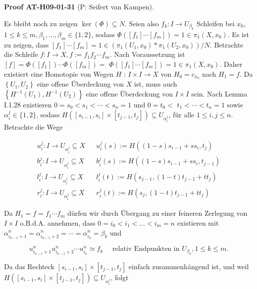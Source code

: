 \documentclass[10pt, letterpaper]{article}
\newcommand{\CustomHeading}[3]{%
  \par\medskip\noindent%
  \textbf{#1 #2} \textnormal{(#3)}.\enskip%
}
\newenvironment{PROOF}[2]{\begin{unitbox}\CustomHeading{Proof}{#1}{#2}}{\end{unitbox}}
\begin{document}
\begin{PROOF}{AT-H09-01-31}{P: Seifert van Kampen}
Es bleibt noch zu zeigen $\operatorname{ker}(\Phi) \subseteq N$. Seien also $f_k: I \rightarrow U_{\beta_k}$ Schleifen bei $x_0$, $1 \leq k \leq m, \beta_1, \ldots, \beta_m \in\{1,2\}$, sodass $\Phi\left(\left[f_1\right] \cdots\left[f_m\right]\right)=1 \in \pi_1\left(X, x_0\right)$. Es ist zu zeigen, dass $\left[f_1\right] \cdots\left[f_m\right]=1 \in\left(\pi_1\left(U_1, x_0\right) * \pi_1\left(U_2, x_0\right)\right) / N$. Betrachte die Schleife $f: I \rightarrow X, f:=f_1 f_2 \cdots f_m$. Nach Voraussetzung ist $[f]=\Phi\left(\left[f_1\right]\right) \cdots \Phi\left(\left[f_m\right]\right)=$ $\Phi\left(\left[f_1\right] \cdots\left[f_m\right]\right)=1 \in \pi_1\left(X, x_0\right)$. Daher existiert eine Homotopie von Wegen $H$ : $I \times I \rightarrow X$ von $H_0=c_{x_0}$ nach $H_1=f$. Da $\left\{U_1, U_2\right\}$ eine offene Überdeckung von $X$ ist, muss auch $\left\{H^{-1}\left(U_1\right), H^{-1}\left(U_2\right)\right\}$ eine offene Überdeckung von $I \times I$ sein. Nach Lemma I.1.28 existieren $0=s_0<s_1<\cdots<s_n=1$ und $0=t_0<$ $t_1<\cdots<t_n=1$ sowie $\alpha_i^j \in\{1,2\}$, sodass $H\left(\left[s_{i-1}, s_i\right] \times\left[t_{j-1}, t_j\right]\right) \subseteq U_{\alpha_i^j}$, für alle $1 \leq i, j \leq n$. Betrachte die Wege

$$
\begin{aligned}
u_i^j: I \rightarrow U_{\alpha_i^j} \subseteq X & & u_i^j(s):=H\left((1-s) s_{i-1}+s s_i, t_j\right) \\
b_i^j: I \rightarrow U_{\alpha_i^j} \subseteq X & & b_i^j(s):=H\left((1-s) s_{i-1}+s s_i, t_{j-1}\right) \\
l_i^j: I \rightarrow U_{\alpha_i^j} \subseteq X & & l_i^j(t):=H\left(s_{j-1},(1-t) t_{j-1}+t t_j\right) \\
r_i^j: I \rightarrow U_{\alpha_i^j} \subseteq X & & r_i^j(t):=H\left(s_j,(1-t) t_{j-1}+t t_j\right)
\end{aligned}
$$


Da $H_1=f=f_1 \cdots f_m$ dürfen wir durch Übergang zu einer feineren Zerlegung von $I \times I$ o.B.d.A. annehmen, dass $0=i_0<i_1<\ldots<i_m=n$ existieren mit $\alpha_{i_{k-1}+1}^n=\alpha_{i_{k-1}+2}^n=\cdots=\alpha_{i_k}^n=\beta_k$ und

$$
u_{i_{k-1}+1}^n u_{i_{k-1}+2}^n \cdots u_{i_k}^n \simeq f_k \quad \text { relativ Endpunkten in } U_{\beta_k}, 1 \leq k \leq m .
$$


Da das Rechteck $\left[s_{i-1}, s_i\right] \times\left[t_{j-1}, t_j\right]$ einfach zusammenhängend ist, und weil $H\left(\left[s_{i-1}, s_i\right] \times\left[t_{j-1}, t_j\right]\right) \subseteq U_{\alpha_i^j}$, folgt


\end{PROOF}
\end{document}
